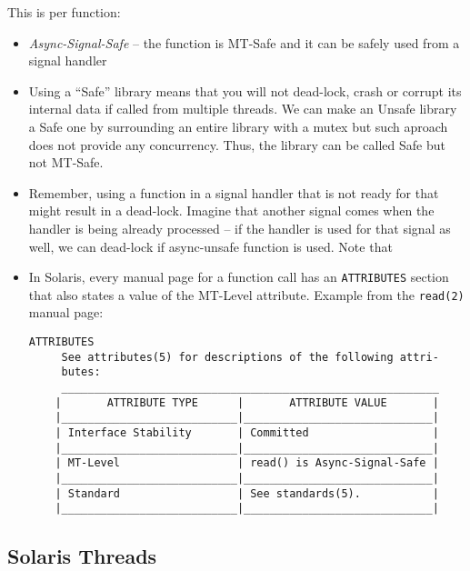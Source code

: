 This is per function:

\begin{itemize}
\item \emph{Async-Signal-Safe} -- the function is MT-Safe and it can be safely
used from a signal handler
\end{itemize}

\begin{itemize}
\item Using a ``Safe'' library means that you will not dead-lock, crash or
corrupt its internal data if called from multiple threads. We can make an Unsafe
library a Safe one by surrounding an entire library with a mutex but such
aproach does not provide any concurrency. Thus, the library can be called Safe
but not MT-Safe.
\item Remember, using a function in a signal handler that is not ready for that
might result in a dead-lock. Imagine that another signal comes when the handler
is being already processed -- if the handler is used for that signal as well, we
can dead-lock if async-unsafe function is used. Note that 
\item In Solaris, every manual page for a function call has an
\texttt{ATTRIBUTES} section that also states a value of the MT-Level
attribute. Example from the \texttt{read(2)} manual page:

\begin{verbatim}
ATTRIBUTES
     See attributes(5) for descriptions of the following attri-
     butes:
     __________________________________________________________
    |       ATTRIBUTE TYPE      |       ATTRIBUTE VALUE       |
    |___________________________|_____________________________|
    | Interface Stability       | Committed                   |
    |___________________________|_____________________________|
    | MT-Level                  | read() is Async-Signal-Safe |
    |___________________________|_____________________________|
    | Standard                  | See standards(5).           |
    |___________________________|_____________________________|
\end{verbatim}
\end{itemize}


\subsection{Solaris Threads}

